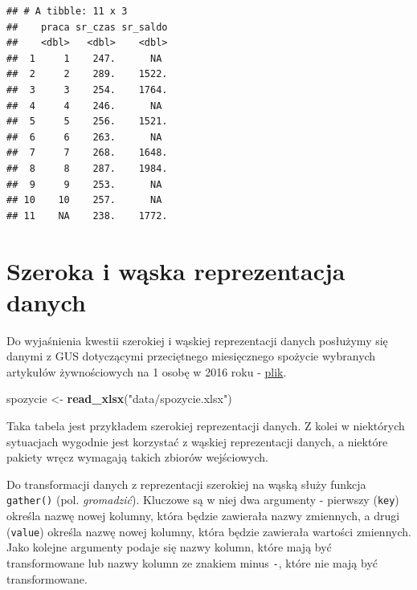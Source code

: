 \documentclass[]{book}
\newenvironment{Shaded}{\begin{snugshade}}{\end{snugshade}}
\newcommand{\KeywordTok}[1]{\textcolor[rgb]{0.13,0.29,0.53}{\textbf{#1}}}
\newcommand{\StringTok}[1]{\textcolor[rgb]{0.31,0.60,0.02}{#1}}
\newcommand{\CommentTok}[1]{\textcolor[rgb]{0.56,0.35,0.01}{\textit{#1}}}
\newcommand{\OperatorTok}[1]{\textcolor[rgb]{0.81,0.36,0.00}{\textbf{#1}}}
\newcommand{\NormalTok}[1]{#1}
\begin{document}
\begin{verbatim}
## # A tibble: 11 x 3
##    praca sr_czas sr_saldo
##    <dbl>   <dbl>    <dbl>
##  1     1    247.      NA 
##  2     2    289.    1522.
##  3     3    254.    1764.
##  4     4    246.      NA 
##  5     5    256.    1521.
##  6     6    263.      NA 
##  7     7    268.    1648.
##  8     8    287.    1984.
##  9     9    253.      NA 
## 10    10    257.      NA 
## 11    NA    238.    1772.
\end{verbatim}

\section{Szeroka i wąska reprezentacja
danych}\label{szeroka-i-waska-reprezentacja-danych}

Do wyjaśnienia kwestii szerokiej i wąskiej reprezentacji danych
posłużymy się danymi z GUS dotyczącymi przeciętnego miesięcznego
spożycie wybranych artykułów żywnościowych na 1 osobę w 2016 roku -
\href{data/spozycie.xlsx}{plik}.

\begin{Shaded}
\begin{Highlighting}[]
\NormalTok{spozycie <-}\StringTok{ }\KeywordTok{read_xlsx}\NormalTok{(}\StringTok{"data/spozycie.xlsx"}\NormalTok{)}
\end{Highlighting}
\end{Shaded}

Taka tabela jest przykładem szerokiej reprezentacji danych. Z kolei w
niektórych sytuacjach wygodnie jest korzystać z wąskiej reprezentacji
danych, a niektóre pakiety wręcz wymagają takich zbiorów wejściowych.

Do transformacji danych z reprezentacji szerokiej na wąską służy funkcja
\texttt{gather()} (pol. \emph{gromadzić}). Kluczowe są w niej dwa
argumenty - pierwszy (\texttt{key}) określa nazwę nowej kolumny, która
będzie zawierała nazwy zmiennych, a drugi (\texttt{value}) określa nazwę
nowej kolumny, która będzie zawierała wartości zmiennych. Jako kolejne
argumenty podaje się nazwy kolumn, które mają być transformowane lub
nazwy kolumn ze znakiem minus \texttt{-}, które nie mają być
transformowane.

\begin{Shaded}
\end{Shaded}
\end{document}
